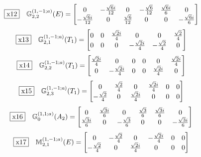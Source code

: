 \documentclass[fleqn,10pt,landscape]{jsarticle}
\begin{document}
\begin{dmath*}
\fbox{x12}\quad \mathbb{G}_{2,2}^{(1,-1;a)}(E)=\begin{bmatrix} 0 & - \frac{\sqrt{6} i}{12} & 0 & - \frac{\sqrt{6}}{12} & \frac{\sqrt{6} i}{6} & 0 \\ - \frac{\sqrt{6} i}{12} & 0 & \frac{\sqrt{6}}{12} & 0 & 0 & - \frac{\sqrt{6} i}{6} \end{bmatrix}
\end{dmath*}
\begin{dmath*}
\fbox{x13}\quad \mathbb{G}_{2,1}^{(1,-1;a)}(T_{1})=\begin{bmatrix} 0 & 0 & \frac{\sqrt{2} i}{4} & 0 & 0 & \frac{\sqrt{2}}{4} \\ 0 & 0 & 0 & - \frac{\sqrt{2} i}{4} & - \frac{\sqrt{2}}{4} & 0 \end{bmatrix}
\end{dmath*}
\begin{dmath*}
\fbox{x14}\quad \mathbb{G}_{2,2}^{(1,-1;a)}(T_{1})=\begin{bmatrix} \frac{\sqrt{2} i}{4} & 0 & 0 & 0 & 0 & \frac{\sqrt{2} i}{4} \\ 0 & - \frac{\sqrt{2} i}{4} & 0 & 0 & \frac{\sqrt{2} i}{4} & 0 \end{bmatrix}
\end{dmath*}
\begin{dmath*}
\fbox{x15}\quad \mathbb{G}_{2,3}^{(1,-1;a)}(T_{1})=\begin{bmatrix} 0 & \frac{\sqrt{2}}{4} & 0 & \frac{\sqrt{2} i}{4} & 0 & 0 \\ - \frac{\sqrt{2}}{4} & 0 & \frac{\sqrt{2} i}{4} & 0 & 0 & 0 \end{bmatrix}
\end{dmath*}
\begin{dmath*}
\fbox{x16}\quad \mathbb{G}_{0}^{(1,1;a)}(A_{2})=\begin{bmatrix} 0 & \frac{\sqrt{3} i}{6} & 0 & \frac{\sqrt{3}}{6} & \frac{\sqrt{3} i}{6} & 0 \\ \frac{\sqrt{3} i}{6} & 0 & - \frac{\sqrt{3}}{6} & 0 & 0 & - \frac{\sqrt{3} i}{6} \end{bmatrix}
\end{dmath*}
\begin{dmath*}
\fbox{x17}\quad \mathbb{M}_{2,1}^{(1,-1;a)}(E)=\begin{bmatrix} 0 & - \frac{\sqrt{2}}{4} & 0 & - \frac{\sqrt{2} i}{4} & 0 & 0 \\ - \frac{\sqrt{2}}{4} & 0 & \frac{\sqrt{2} i}{4} & 0 & 0 & 0 \end{bmatrix}
\end{dmath*}
\end{document}
